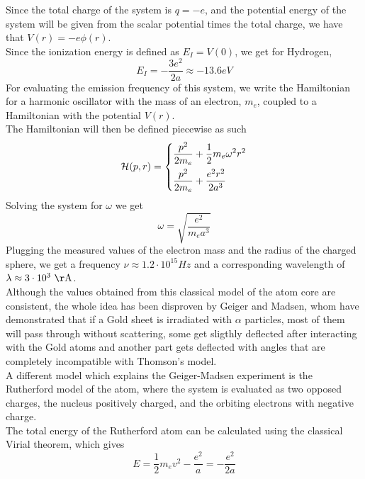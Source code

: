 \documentclass[../qm.tex]{subfiles}
\begin{document}
	Since the total charge of the system is $q=-e$, and the potential energy of the system will be given from the scalar potential times the total charge, we have that $V(r)=-e\phi(r)$.\\
	Since the ionization energy is defined as $E_I=V(0)$, we get for Hydrogen,
	\begin{equation*}
		E_I=-\frac{3e^2}{2a}\approx-13.6\unit{eV}
	\end{equation*}
	For evaluating the emission frequency of this system, we write the Hamiltonian for a harmonic oscillator with the mass of an electron, $m_e$, coupled to a Hamiltonian with the potential $V(r)$.\\
	The Hamiltonian will then be defined piecewise as such
	\begin{equation}
		\mathcal{H}(p,r)=\begin{dcases}
			\frac{p^2}{2m_e}+\frac{1}{2}m_e\omega^2r^2\\
			\frac{p^2}{2m_e}+\frac{e^2r^2}{2a^3}
		\end{dcases}
		\label{eq:thomsonham}
	\end{equation}
	Solving the system for $\omega$ we get
	\begin{equation*}
		\omega=\sqrt{\frac{e^2}{m_ea^3}}
	\end{equation*}
	Plugging the measured values of the electron mass and the radius of the charged sphere, we get a frequency $\nu\approx1.2\cdot10^{15}\unit{Hz}$ and a corresponding wavelength of $\lambda\approx3\cdot10^3\unit{\AA}$.\\
	Although the values obtained from this classical model of the atom core are consistent, the whole idea has been disproven by Geiger and Madsen, whom have demonstrated that if a Gold sheet is irradiated with $\alpha$ particles, most of them will pass through without scattering, some get sligthly deflected after interacting with the Gold atoms and another part gets deflected with angles that are completely incompatible with Thomson's model.\\
	A different model which explains the Geiger-Madsen experiment is the Rutherford model of the atom, where the system is evaluated as two opposed charges, the nucleus positively charged, and the orbiting electrons with negative charge.\\
	The total energy of the Rutherford atom can be calculated using the classical Virial theorem, which gives
	\begin{equation}
		E=\frac{1}{2}m_ev^2-\frac{e^2}{a}=-\frac{e^2}{2a}
		\label{eq:rutherfordenergy}
	\end{equation}
\end{document}
